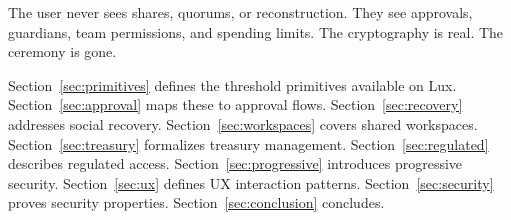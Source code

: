 The user never sees shares, quorums, or reconstruction. They see approvals,
guardians, team permissions, and spending limits. The cryptography is real.
The ceremony is gone.

Section~\ref{sec:primitives} defines the threshold primitives available on
Lux. Section~\ref{sec:approval} maps these to approval flows.
Section~\ref{sec:recovery} addresses social recovery.
Section~\ref{sec:workspaces} covers shared workspaces.
Section~\ref{sec:treasury} formalizes treasury management.
Section~\ref{sec:regulated} describes regulated access.
Section~\ref{sec:progressive} introduces progressive security.
Section~\ref{sec:ux} defines UX interaction patterns.
Section~\ref{sec:security} proves security properties.
Section~\ref{sec:conclusion} concludes.

